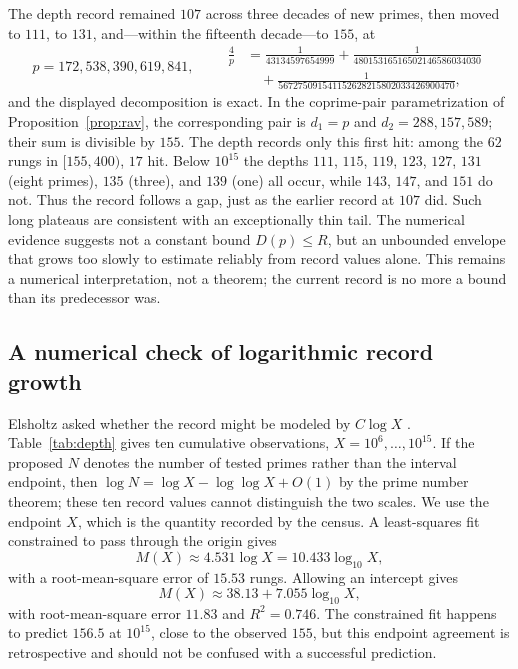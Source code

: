 \documentclass[11pt]{article}
\theoremstyle{definition}
\theoremstyle{remark}
\begin{document}
The depth record remained $107$ across three decades of new primes, then moved to
$111$, to $131$, and---within the fifteenth decade---to $155$, at
\[
p = 172{,}538{,}390{,}619{,}841, \qquad
\begin{aligned}
\frac{4}{p} &= \frac{1}{43134597654999} + \frac{1}{48015316516502146586034030} \\[2pt]
            &\quad + \frac{1}{567275091541152628215802033426900470},
\end{aligned}
\]
and the displayed decomposition is exact. In the coprime-pair parametrization of
Proposition~\ref{prop:rav}, the corresponding pair is
$d_1=p$ and $d_2=288{,}157{,}589$; their sum is divisible by $155$.
The depth records only this first hit: among the $62$ rungs in $[155,400)$,
$17$ hit. Below $10^{15}$ the depths
$111$, $115$, $119$, $123$, $127$, $131$ (eight primes), $135$ (three), and $139$ (one)
all occur, while $143$, $147$, and $151$ do not. Thus the record follows a gap, just as
the earlier record at $107$ did. Such long plateaus are consistent with an exceptionally
thin tail. The numerical evidence suggests not a constant bound $D(p)\le R$, but an
unbounded envelope that grows too slowly to estimate reliably from record values alone.
This remains a numerical interpretation, not a theorem; the current record is no more a
bound than its predecessor was.

\subsection{A numerical check of logarithmic record growth}\label{sec:logdepth}

Elsholtz asked whether the record might be modeled by $C\log X$
\cite{ElsholtzPC2026}. Table~\ref{tab:depth} gives ten cumulative observations,
$X=10^6,\ldots,10^{15}$. If the proposed $N$ denotes the number of tested primes
rather than the interval endpoint, then $\log N=\log X-\log\log X+O(1)$ by the prime
number theorem; these ten record values cannot distinguish the two scales. We use the
endpoint $X$, which is the quantity recorded by the census. A least-squares fit
constrained to pass through the origin gives
\begin{equation}\label{eq:logfit}
M(X)\approx 4.531\log X
       =10.433\log_{10}X,
\end{equation}
with a root-mean-square error of $15.53$ rungs. Allowing an intercept gives
\[
M(X)\approx38.13+7.055\log_{10}X,
\]
with root-mean-square error $11.83$ and $R^2=0.746$. The constrained fit happens to
predict $156.5$ at $10^{15}$, close to the observed $155$, but this endpoint agreement
is retrospective and should not be confused with a successful prediction.
\end{document}
